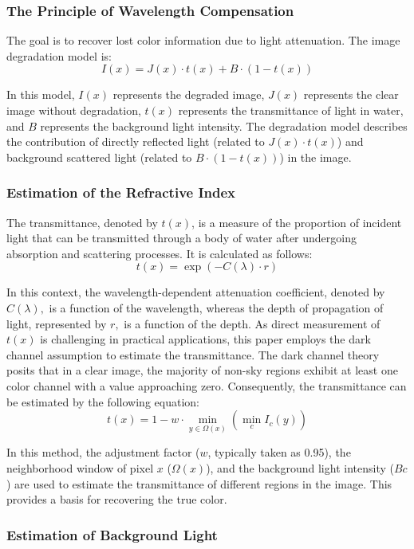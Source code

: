 \documentclass[withoutpreface,bwprint]{cumcmthesis}
\begin{document}
\subsubsection{The Principle of Wavelength Compensation}

The goal is to recover lost color information due to light attenuation. The image degradation model is:
\[I(x) = J(x) \cdot t(x) + B \cdot (1 - t(x))\]

In this model, $I(x)$ represents the degraded image, $J(x)$ represents the clear image without degradation, $t(x)$ represents the transmittance of light in water, and $B$ represents the background light intensity. The degradation model describes the contribution of directly reflected light (related to $J(x) \cdot t(x)$) and background scattered light (related to $B \cdot (1 - t(x))$) in the image.

\subsubsection{Estimation of the Refractive Index}

The transmittance, denoted by $t(x)$, is a measure of the proportion of incident light that can be transmitted through a body of water after undergoing absorption and scattering processes. It is calculated as follows:
\[t(x) = \exp(-C(\lambda) \cdot r)\]

In this context, the wavelength-dependent attenuation coefficient, denoted by $C(\lambda),$ is a function of the wavelength, whereas the depth of propagation of light, represented by $r,$ is a function of the depth. As direct measurement of $t(x)$ is challenging in practical applications, this paper employs the dark channel assumption to estimate the transmittance. The dark channel theory posits that in a clear image, the majority of non-sky regions exhibit at least one color channel with a value approaching zero. Consequently, the transmittance can be estimated by the following equation:
\[t(x) = 1 - w \cdot \min_{y \in \Omega(x)} \left( \min_c I_c(y) \right)\]

In this method, the adjustment factor ($w$, typically taken as 0.95), the neighborhood window of pixel $x$ ($\Omega(x)$), and the background light intensity ($Bc$) are used to estimate the transmittance of different regions in the image. This provides a basis for recovering the true color.

\subsubsection{Estimation of Background Light}
\end{document}
